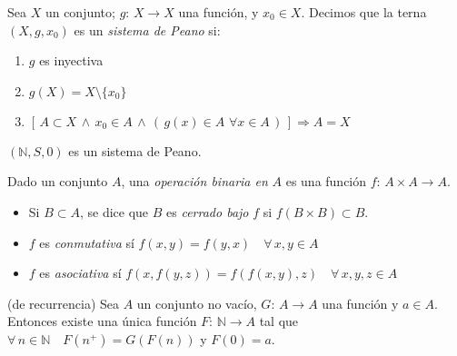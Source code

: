     \begin{definition}
        Sea $X$ un conjunto; $g:\, X \rightarrow X$ una función, y $x_0 \in X$.
        Decimos que la terna $(X, g, x_0)$ es un \textit{sistema de Peano} si:
        \begin{enumerate}
            \item $g$ es inyectiva
            \item $g(X) = X \setminus \{x_0\}$
            \item $[\, A\subset X \, \land \, x_0 \in A \, \land \, ( \, g(x)
                \in A \, \, \forall x \in A \, ) \, ] \Rightarrow A=X$
        \end{enumerate}
    \end{definition}
    \begin{remark}
        $(\mathbb{N}, S, 0)$ es un sistema de Peano.
    \end{remark}
    \begin{definition}
        Dado un conjunto $A$, una \textit{operación binaria en} $A$ es una
        función $f: \, A\times A \rightarrow A$.
        \begin{itemize}
            \item Si $B \subset A$, se dice que $B$ es \textit{cerrado bajo} $f$
                si $f(B\times B) \subset B$.
            \item $f$ es \textit{conmutativa} sí $f(x,y)=f(y,x)\quad \forall \,
                x, y \in A$
            \item $f$ es \textit{asociativa} sí $f(x, f(y,z)) = f(f(x, y), z)
                \quad \forall \, x, y, z \in A$
        \end{itemize}
    \end{definition}
    \begin{proposition}{(de recurrencia)}\label{pr:recurrencia} Sea $A$ un conjunto no vacío, $G: \, A
        \rightarrow A$ una función y $a \in A$. Entonces existe una única
        función $F: \, \mathbb{N} \rightarrow A$ tal que $\forall \, n \in
        \mathbb{N} \quad F(n^+)= G(F(n))$ y $F(0) = a$.
    \end{proposition}
